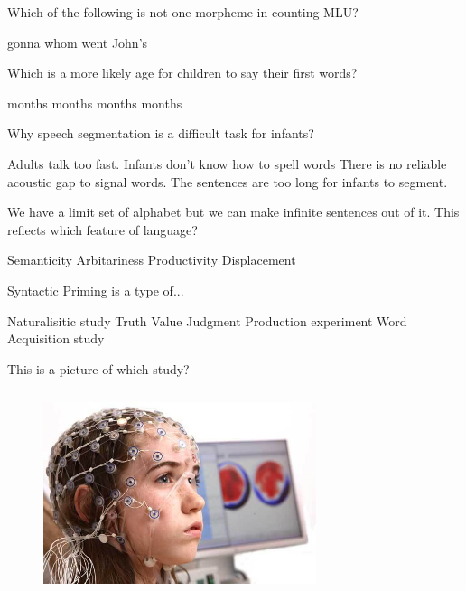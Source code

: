 \documentclass[legalpaper, 12pt, addpoints, answers]{exam}
\begin{document}
\begin{questions}
\vspace{0.10in}

\question Which of the following is not one morpheme in counting MLU?

\begin{oneparchoices}
    \choice gonna
    \choice whom
    \choice went
    \choice John's
\end{oneparchoices}
\vspace{0.10in}
\question Which is a more likely age for children to say their first words?

\begin{oneparchoices}
       months
       months
       months
       months
\end{oneparchoices}
\vspace{0.10in}
\question Why speech segmentation is a difficult task for infants?

\begin{choices}
      \choice Adults talk too fast.
      \choice Infants don't know how to spell words
      \choice There is no reliable acoustic gap to signal words.
      \choice The sentences are too long for infants to segment.
\end{choices}
\question We have a limit set of alphabet but we can make infinite sentences out of it. This reflects which feature of language?

\begin{choices}
      \choice Semanticity
      \choice Arbitariness
      \choice Productivity
      \choice Displacement
\end{choices} 
\question Syntactic Priming is a type of...

\begin{choices}
      \choice Naturalisitic study 
      \choice Truth Value Judgment
      \choice Production experiment
      \choice Word Acquisition study
\end{choices} 

\question This is a picture of which study?
    \begin{figure}[h]
        \centering
          \includegraphics[height = 6cm, width = 8cm]{global-adult-eeg-cap-market-1.jpg}
        \end{figure}


\end{questions}
\end{document}
